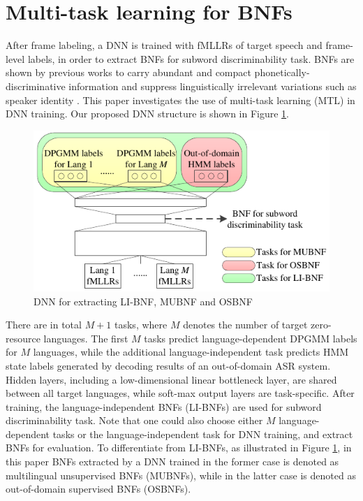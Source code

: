 \documentclass[a4paper]{article}
\begin{document}
\section{Multi-task learning for BNFs}
\label{sec:MTL}
After frame labeling, a DNN is trained with fMLLRs of target speech and frame-level labels, in order to extract BNFs for subword discriminability task. 
BNFs are shown by previous works to carry abundant and compact phonetically-discriminative information and suppress linguistically irrelevant variations such as speaker identity \cite{grezl2009investigation}.
This paper investigates the use of multi-task learning (MTL)  \cite{caruana1998multitask} in DNN training. Our proposed DNN structure is shown in Figure \ref{fig:mtl}. 
\begin{figure}[htbp]
\centering
\includegraphics[width = 0.8 \linewidth]{MTL_tnr_embed.pdf}
\caption{DNN for extracting LI-BNF, MUBNF and OSBNF}
\label{fig:mtl}
\end{figure}
There are in total $M+1$ tasks, where $M$ denotes the number of target zero-resource languages. The first $M$ tasks predict language-dependent DPGMM labels for $M$ languages, while the additional language-independent task predicts HMM state labels generated by decoding results of an out-of-domain ASR system.
Hidden layers, including a low-dimensional linear bottleneck layer, are shared between all target languages, while soft-max output layers are task-specific. After training, the language-independent BNFs (LI-BNFs) are used for subword discriminability task. Note that
one could also choose either $M$ language-dependent tasks or the language-independent task for DNN training, and extract BNFs for evaluation. To differentiate from LI-BNFs, as illustrated in Figure \ref{fig:mtl}, in this paper BNFs extracted by a DNN trained in the former case is denoted as multilingual unsupervised  BNFs (MUBNFs), while  in the latter case is denoted as out-of-domain supervised BNFs (OSBNFs).
\end{document}
